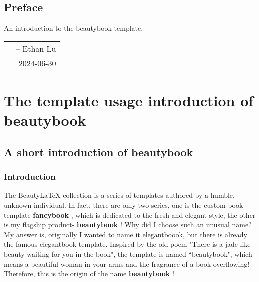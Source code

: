 \documentclass[lang=en,12pt]{beautybook}
\begin{document}
\frontmatter
{}

{%
\thispagestyle{empty}
\chapter*{Preface}
An introduction to the beautybook template.


\hfill
\begin{tabular}{lr}
    &-- Ethan Lu\\ 
    & 2024-06-30
\end{tabular}
\clearpage}

\thispagestyle{empty}
\tableofcontents\let\cleardoublepage\clearpage


\mainmatter
{}

\part{The template usage introduction of \textbf{beautybook}}

\chapter{A short introduction of \textbf{beautybook}}

\section{Introduction}

The Beauty\LaTeX{} collection is a series of templates authored by a humble, unknown individual. In fact, there are only two series, one is the custom book template \textbf{fancybook } , which is dedicated to the fresh and elegant style, the other is my flagship product-\textbf{ beautybook } !  Why did I choose such an unusual name? My answer is, originally I wanted to name it elegantboook, but there is already the famous elegantbook template. Inspired by the old poem "There is a jade-like beauty waiting for you in the book", the template is named ``beautybook", which means a beautiful woman in your arms and the fragrance of a book overflowing! Therefore, this is the origin of the name \textbf{beautybook } !
\end{document}

